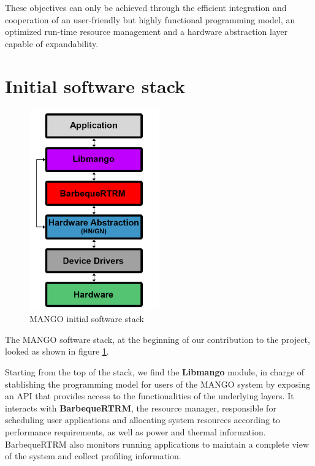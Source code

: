 These objectives can only be achieved through the efficient integration and cooperation of an user-friendly but highly functional programming model, an optimized run-time resource management and a hardware abstraction layer capable of expandability.

\section{Initial software stack}

\begin{figure}[ht]
    \centering
    \includegraphics[width=0.5\textwidth]{img/mango-initial-stack.png}
    \captionsetup{justification=centering}
    \caption{MANGO initial software stack}
    \label{fig:mango_initial_stack}
\end{figure}
 
The MANGO software stack, at the beginning of our contribution to the project, looked as shown in figure \ref{fig:mango_initial_stack}.

Starting from the top of the stack, we find the \textbf{Libmango} module, in charge of stablishing the programming model for users of the MANGO system by exposing an API that provides access to the functionalities of the underlying layers. 
It interacts with \textbf{BarbequeRTRM}, the resource manager, responsible for scheduling user applications and allocating system resources according to performance requirements, as well as power and thermal information. BarbequeRTRM also monitors running applications to maintain a complete view of the system and collect profiling information.


